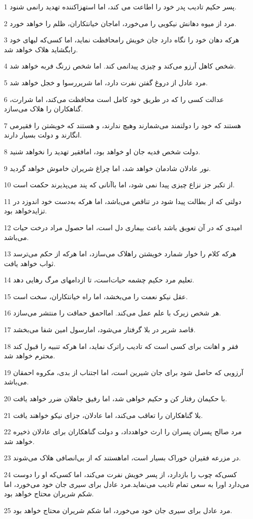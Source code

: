 \par 1 پسر حکیم تادیب پدر خود را اطاعت می کند، اما استهزاکننده تهدید رانمی شنود.
\par 2 مرد از میوه دهانش نیکویی را می‌خورد، اماجان خیانتکاران، ظلم را خواهد خورد.
\par 3 هر‌که دهان خود را نگاه دارد جان خویش رامحافظت نماید، اما کسی‌که لبهای خود رابگشاید هلاک خواهد شد.
\par 4 شخص کاهل آرزو می‌کند و چیزی پیدانمی کند. اما شخص زرنگ فربه خواهد شد.
\par 5 مرد عادل از دروغ گفتن نفرت دارد، اما شریررسوا و خجل خواهد شد.
\par 6 عدالت کسی را که در طریق خود کامل است محافظت می‌کند، اما شرارت، گناهکاران را هلاک می‌سازد.
\par 7 هستند که خود را دولتمند می‌شمارند وهیچ ندارند، و هستند که خویشتن را فقیرمی انگارند و دولت بسیار دارند.
\par 8 دولت شخص فدیه جان او خواهد بود، امافقیر تهدید را نخواهد شنید.
\par 9 نور عادلان شادمان خواهد شد، اما چراغ شریران خاموش خواهد گردید.
\par 10 از تکبر جز نزاع چیزی پیدا نمی شود، اما باآنانی که پند می‌پذیرند حکمت است.
\par 11 دولتی که از بطالت پیدا شود در تناقص می‌باشد، اما هر‌که به‌دست خود اندوزد در تزایدخواهد بود.
\par 12 امیدی که در آن تعویق باشد باعث بیماری دل است، اما حصول مراد درخت حیات می‌باشد.
\par 13 هر‌که کلام را خوار شمارد خویشتن راهلاک می‌سازد، اما هر‌که از حکم می‌ترسد ثواب خواهد یافت.
\par 14 تعلیم مرد حکیم چشمه حیات‌است، تا ازدامهای مرگ رهایی دهد.
\par 15 عقل نیکو نعمت را می‌بخشد، اما راه خیانتکاران، سخت است.
\par 16 هر شخص زیرک با علم عمل می‌کند. امااحمق حماقت را منتشر می‌سازد.
\par 17 قاصد شریر در بلا گرفتار می‌شود، امارسول امین شفا می‌بخشد.
\par 18 فقر و اهانت برای کسی است که تادیب راترک نماید، اما هر‌که تنبیه را قبول کند محترم خواهد شد.
\par 19 آرزویی که حاصل شود برای جان شیرین است، اما اجتناب از بدی، مکروه احمقان می‌باشد.
\par 20 با حکیمان رفتار کن و حکیم خواهی شد، اما رفیق جاهلان ضرر خواهد یافت.
\par 21 بلا گناهکاران را تعاقب می‌کند، اما عادلان، جزای نیکو خواهند یافت.
\par 22 مرد صالح پسران پسران را ارث خواهدداد، و دولت گناهکاران برای عادلان ذخیره خواهد شد.
\par 23 در مزرعه فقیران خوراک بسیار است، اماهستند که از بی‌انصافی هلاک می‌شوند. 
\par 24 کسی‌که چوب را باز‌دارد، از پسر خویش نفرت می‌کند، اما کسی‌که او را دوست می‌دارد اورا به سعی تمام تادیب می‌نماید.مرد عادل برای سیری جان خود می‌خورد، اما شکم شریران محتاج خواهد بود.
\par 25 مرد عادل برای سیری جان خود می‌خورد، اما شکم شریران محتاج خواهد بود.
 
